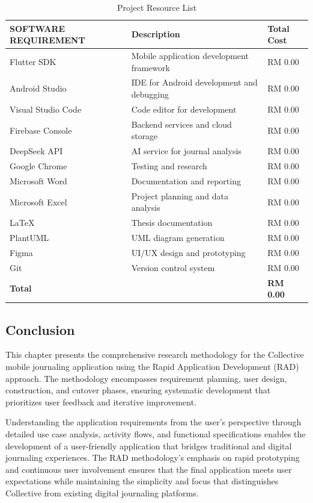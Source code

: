 \begin{table}[H]
\centering
\caption{Project Resource List}
\label{tab:resource-list}
\begin{tabular}{|p{3.5cm}|p{6cm}|p{3.5cm}|}
\hline
\textbf{SOFTWARE REQUIREMENT} & \textbf{Description} & \textbf{Total Cost} \\
\hline
Flutter SDK & Mobile application development framework & RM 0.00 \\
\hline
Android Studio & IDE for Android development and debugging & RM 0.00 \\
\hline
Visual Studio Code & Code editor for development & RM 0.00 \\
\hline
Firebase Console & Backend services and cloud storage & RM 0.00 \\
\hline
DeepSeek API & AI service for journal analysis & RM 0.00 \\
\hline
Google Chrome & Testing and research & RM 0.00 \\
\hline
Microsoft Word & Documentation and reporting & RM 0.00 \\
\hline
Microsoft Excel & Project planning and data analysis & RM 0.00 \\
\hline
LaTeX & Thesis documentation & RM 0.00 \\
\hline
PlantUML & UML diagram generation & RM 0.00 \\
\hline
Figma & UI/UX design and prototyping & RM 0.00 \\
\hline
Git & Version control system & RM 0.00 \\
\hline
\textbf{Total} & & \textbf{RM 0.00} \\
\hline
\end{tabular}
\end{table}

\subsection{Conclusion}\label{subsec:methodologyConclusion}

This chapter presents the comprehensive research methodology for the Collective mobile journaling application using the Rapid Application Development (RAD) approach. The methodology encompasses requirement planning, user design, construction, and cutover phases, ensuring systematic development that prioritizes user feedback and iterative improvement.

Understanding the application requirements from the user's perspective through detailed use case analysis, activity flows, and functional specifications enables the development of a user-friendly application that bridges traditional and digital journaling experiences. The RAD methodology's emphasis on rapid prototyping and continuous user involvement ensures that the final application meets user expectations while maintaining the simplicity and focus that distinguishes Collective from existing digital journaling platforms.
